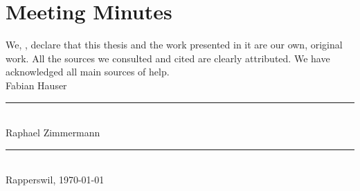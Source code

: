 \section{Meeting Minutes}\label{sec:meeting-minutes}







\begin{declaration}
\addchaptertocentry{\authorshipname} %
\noindent We, \authorname, declare that this thesis and the work presented in it are our own, original work.  All the sources we consulted and cited are clearly attributed. We have acknowledged all main sources of help. \\

\noindent Fabian Hauser\\[2em]
\rule[0.5em]{25em}{0.5pt}\\ %
\noindent Raphael Zimmermann\\[2em]
\rule[0.5em]{25em}{0.5pt}\\ %
\noindent Rapperswil, \today
\end{declaration}

\cleardoublepage



  
